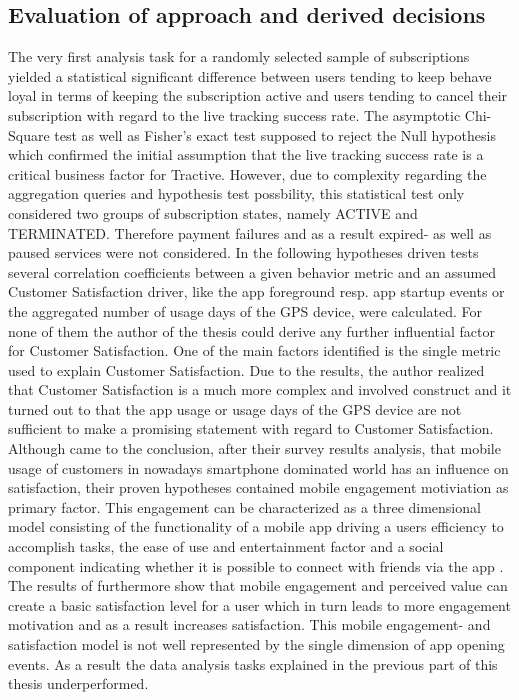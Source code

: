 \subsection{Evaluation of approach and derived decisions}
The very first analysis task for a randomly selected sample of subscriptions yielded a statistical significant difference between users tending to keep behave loyal in terms of keeping the subscription active and users tending to cancel their subscription with regard to the live tracking success rate. The asymptotic Chi-Square test as well as Fisher's exact test supposed to reject the Null hypothesis which confirmed the initial assumption that the live tracking success rate is a critical business factor for Tractive. However, due to complexity regarding the aggregation queries and hypothesis test possbility, this statistical test only considered two groups of subscription states, namely ACTIVE and TERMINATED. Therefore payment failures and as a result expired- as well as paused services were not considered. In the following hypotheses driven tests several correlation coefficients between a given behavior metric and an assumed Customer Satisfaction driver, like the app foreground resp. app startup events or the aggregated number of usage days of the GPS device, were calculated. For none of them the author of the thesis could derive any further influential factor for Customer Satisfaction. One of the main factors identified is the single metric used to explain Customer Satisfaction. Due to the results, the author realized that Customer Satisfaction is a much more complex and involved construct and it turned out to that the app usage or usage days of the GPS device are not sufficient to make a promising statement with regard to Customer Satisfaction. Although \cite{kim2013study} came to the conclusion, after their survey results analysis, that mobile usage of customers in nowadays smartphone dominated world has an influence on satisfaction, their proven hypotheses contained mobile engagement motiviation as primary factor. This engagement can be characterized as a three dimensional model consisting of the functionality of a mobile app driving a users efficiency to accomplish tasks, the ease of use and entertainment factor and a social component indicating whether it is possible to connect with friends via the app \cite{VARNALI2010144}. The results of \cite{kim2013study} furthermore show that mobile engagement and perceived value can create a basic satisfaction level for a user which in turn leads to more engagement motivation and as a result increases satisfaction. This mobile engagement- and satisfaction model is not well represented by the single dimension of app opening events. As a result the data analysis tasks explained in the previous part of this thesis underperformed.
